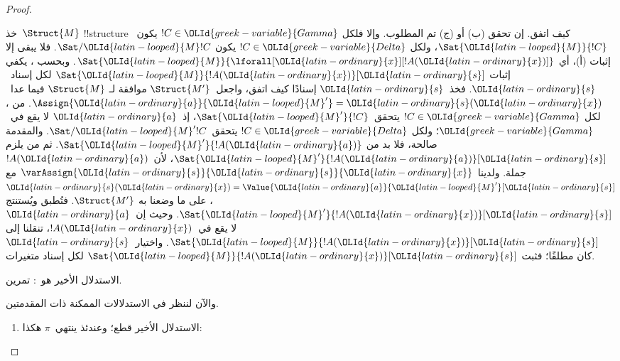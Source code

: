 \documentclass[../../../include/open-logic-section]{subfiles}
\begin{document}
\begin{proof}
\begin{enumerate}
{  خذ~$\Struct{M}$ !!{structure} كيف اتفق.
  إن تحقق (ب) أو (ج) تم المطلوب. وإلا فلكل
  $!C \in {\OLId{greek-variable}{Gamma}}$ يكون~$\Sat{{\OLId{latin-looped}{M}}}{!C}$، ولكل $!C \in {\OLId{greek-variable}{Delta}}$ يكون
  $\Sat/{{\OLId{latin-looped}{M}}}{!C}$. فلا يبقى إلا إثبات (أ)، أي
  $\Sat{{\OLId{latin-looped}{M}}}{\lforall[{\OLId{latin-ordinary}{x}}][!A({\OLId{latin-ordinary}{x}})]}$.
  وبحسب ، يكفي إثبات
  $\Sat{{\OLId{latin-looped}{M}}}{!A({\OLId{latin-ordinary}{x}})}[{\OLId{latin-ordinary}{s}}]$ لكل إسناد~${\OLId{latin-ordinary}{s}}$.
  فخذ~${\OLId{latin-ordinary}{s}}$ إسنادًا كيف اتفق، واجعل~$\Struct{M'}$ موافقة لـ
  $\Struct{M}$ فيما عدا~$\Assign{{\OLId{latin-ordinary}{a}}}{{\OLId{latin-looped}{M}}'} = {\OLId{latin-ordinary}{s}}({\OLId{latin-ordinary}{x}})$.
  من ، لكل $!C \in {\OLId{greek-variable}{Gamma}}$
  يتحقق~$\Sat{{\OLId{latin-looped}{M}}'}{!C}$، إذ~${\OLId{latin-ordinary}{a}}$ لا يقع في~${\OLId{greek-variable}{Gamma}}$؛ ولكل
  $!C \in {\OLId{greek-variable}{Delta}}$ يتحقق~$\Sat/{{\OLId{latin-looped}{M}}'}{!C}$.
  والمقدمة صالحة، فلا بد من $\Sat{{\OLId{latin-looped}{M}}'}{!A({\OLId{latin-ordinary}{a}})}$.
  ثم من  يلزم
  $\Sat{{\OLId{latin-looped}{M}}'}{!A({\OLId{latin-ordinary}{a}})}[{\OLId{latin-ordinary}{s}}]$، لأن~$!A({\OLId{latin-ordinary}{a}})$ جملة.
  ولدينا $\varAssign{{\OLId{latin-ordinary}{s}}}{{\OLId{latin-ordinary}{s}}}{{\OLId{latin-ordinary}{x}}}$ مع ${\OLId{latin-ordinary}{s}}({\OLId{latin-ordinary}{x}}) = \Value{{\OLId{latin-ordinary}{a}}}{{\OLId{latin-looped}{M}}'}[{\OLId{latin-ordinary}{s}}]$، على ما وضعنا به
  $\Struct{M'}$. فتُطبق
   ويُستنتج
  $\Sat{{\OLId{latin-looped}{M}}'}{!A({\OLId{latin-ordinary}{x}})}[{\OLId{latin-ordinary}{s}}]$.
  وحيث إن~${\OLId{latin-ordinary}{a}}$ لا يقع في~$!A({\OLId{latin-ordinary}{x}})$، تنقلنا
   إلى
  $\Sat{{\OLId{latin-looped}{M}}}{!A({\OLId{latin-ordinary}{x}})}[{\OLId{latin-ordinary}{s}}]$.
  واختيار~${\OLId{latin-ordinary}{s}}$ كان مطلقًا؛ فثبت
  $\Sat{{\OLId{latin-looped}{M}}}{!A({\OLId{latin-ordinary}{x}})}[{\OLId{latin-ordinary}{s}}]$ لكل إسناد متغيرات.
\item الاستدلال الأخير هو~\LeftR{\lexists}: تمرين.
}{}
\end{enumerate}
والآن لننظر في الاستدلالات الممكنة ذات المقدمتين.
\begin{enumerate}
\item الاستدلال الأخير قطع؛ وعندئذ ينتهي~$\pi$ هكذا:

\end{enumerate}
\end{proof}
\end{document}

